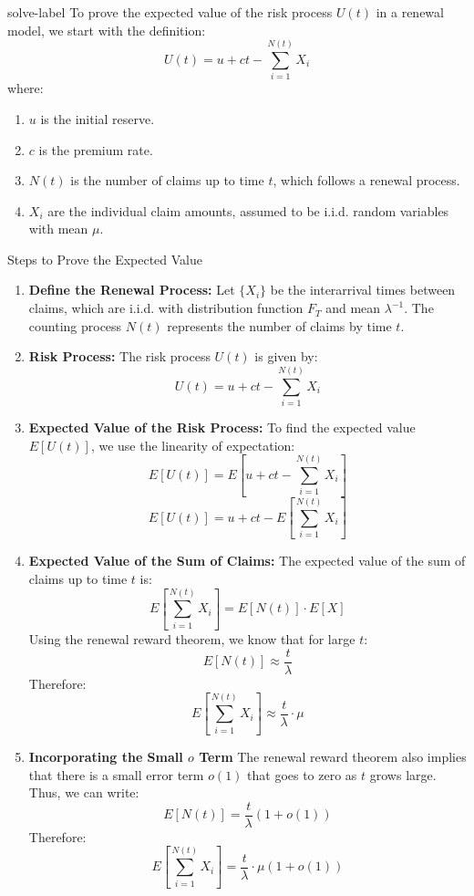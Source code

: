 	\begin{solve}{}{solve-label}
		To prove the expected value of the risk process \( U(t) \) in a renewal model, we start with the definition:
		$$U(t) = u + ct - \sum_{i=1}^{N(t)} X_i$$
		where:
		\begin{enumerate}
		\item \( u \) is the initial reserve.
		\item \( c \) is the premium rate.
		\item \( N(t) \) is the number of claims up to time \( t \), which follows a renewal process.
		\item  \( X_i \) are the individual claim amounts, assumed to be i.i.d. random variables with mean \( \mu \). 
	\end{enumerate}
	Steps to Prove the Expected Value
	\begin{enumerate}
		
		\item \textbf{Define the Renewal Process:}
		\subitem Let \( \{X_i\} \) be the interarrival times between claims, which are i.i.d. with distribution function \( F_T \) and mean \( \lambda^{-1} \).
		\subitem The counting process \( N(t) \) represents the number of claims by time \( t \).
		
		\item \textbf{Risk Process:}
		\subitem The risk process \( U(t) \) is given by:
		$$U(t) = u + ct - \sum_{i=1}^{N(t)} X_i$$
		
		\item \textbf{Expected Value of the Risk Process:}
		\subitem To find the expected value \( E[U(t)] \), we use the linearity of expectation:
		$$E[U(t)] = E[u + ct - \sum_{i=1}^{N(t)} X_i]$$
		$$E[U(t)] = u + ct - E[\sum_{i=1}^{N(t)} X_i]$$
		
		\item \textbf{Expected Value of the Sum of Claims:}
		\subitem The expected value of the sum of claims up to time \( t \) is:
		$$E[\sum_{i=1}^{N(t)} X_i] = E[N(t)] \cdot E[X]$$
		\subitem Using the renewal reward theorem, we know that for large \( t \):
		$$E[N(t)] \approx \frac{t}{\lambda}$$
		\subitem Therefore:
		$$E[\sum_{i=1}^{N(t)} X_i] \approx \frac{t}{\lambda} \cdot \mu$$
		
		\item \textbf{Incorporating the Small \( o \) Term}
		\subitem The renewal reward theorem also implies that there is a small error term \( o(1) \) that goes to zero as \( t \) grows large. Thus, we can write:
		$$E[N(t)] = \frac{t}{\lambda} (1 + o(1))$$
		\subitem Therefore:
		$$E[\sum_{i=1}^{N(t)} X_i] = \frac{t}{\lambda} \cdot \mu (1 + o(1))$$
		

\end{enumerate}
\end{solve}
